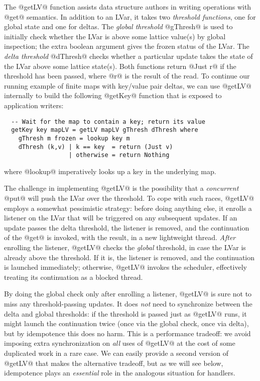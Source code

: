 The @getLV@ function assists data structure authors in writing operations with
@get@ semantics.  In addition to an LVar, it takes two \emph{threshold
  functions}, one for global state and one for deltas.  The \emph{global threshold} @gThresh@ is
used to initially check whether the LVar is above some lattice value(s) by
global inspection; the extra boolean argument gives the frozen status of the
LVar.  The \emph{delta threshold} @dThresh@ checks whether a particular update 
takes the state of the LVar above some lattice state(s).
Both functions return @Just r@ if the threshold
has been passed, where @r@ is the result of the read.
To continue our running example of finite maps with
key/value pair deltas, we can use @getLV@ internally to build the following
@getKey@ function that is exposed to application writers:
\begin{lstlisting}
  -- Wait for the map to contain a key; return its value
  getKey key mapLV = getLV mapLV gThresh dThresh where
    gThresh m frozen = lookup key m
    dThresh (k,v) | k == key  = return (Just v)
                  | otherwise = return Nothing 
\end{lstlisting}
where @lookup@ imperatively looks up a key in the underlying map.

The challenge in implementing @getLV@ is the possibility that a
\emph{concurrent} @put@ will push the LVar over the threshold.  To cope with
such races, @getLV@ employs a somewhat pessimistic strategy: before doing
anything else, it enrolls a listener on the LVar that will be triggered on any
subsequent updates.  If an update passes the delta threshold, the listener is
removed, and the continuation of the @get@ is invoked, with the result, in a new
lightweight thread.  \emph{After} enrolling the listener, @getLV@ checks the
\emph{global} threshold, in case the LVar is already above the threshold.  If it
is, the listener is removed, and the continuation is launched immediately;
otherwise, @getLV@ invokes the scheduler, effectively treating its continuation
as a blocked thread.  

By doing the global check only after enrolling a listener, @getLV@ is sure not
to miss any threshold-passing updates.  It does \emph{not} need to synchronize
between the delta and global thresholds: if the threshold is passed just as
@getLV@ runs, it might launch the continuation twice (once via the global check,
once via delta), but by idempotence this does no harm.  This is a performance
tradeoff: we avoid imposing extra synchronization on \emph{all} uses of @getLV@
at the cost of some duplicated work in a rare case.  We can easily provide a
second version of @getLV@ that makes the alternative tradeoff, but as we will
see below, idempotence plays an \emph{essential} role in the analogous situation
for handlers.

